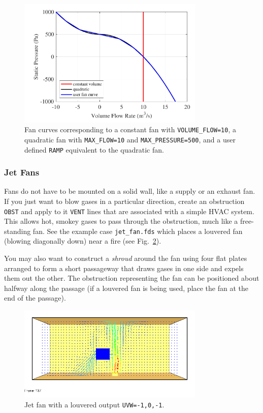 \documentclass[11pt]{book}
\newcommand{\ct}{\tt\small}
\begin{document}
\begin{figure}[ht!]
\begin{center}
\includegraphics[width=3.5in]{SCRIPT_FIGURES/fan_curve}
\caption[Example of fan curves]{Fan curves corresponding to a constant fan with {\ct VOLUME\_FLOW=10}, a quadratic fan with {\ct MAX\_FLOW=10} and {\ct MAX\_PRESSURE=500}, and a user defined {\ct RAMP} equivalent to the quadratic fan.}
\label{fig:Fan_Curve}
\end{center}
\end{figure}

\subsubsection{Jet Fans}

Fans do not have to be mounted on a solid wall, like a supply or an exhaust fan.
If you just want to blow gases in a particular direction, create an
obstruction {\ct OBST} and apply to it {\ct VENT} lines that are
associated with a simple HVAC system.
This allows hot, smokey gases to pass through the
obstruction, much like a free-standing fan.  See the example case {\ct jet\_fan.fds} which places a louvered fan (blowing diagonally down) near a fire (see Fig.~\ref{fig:Jet_Fan}).

You may also want to construct a {\em shroud} around the fan using four flat plates arranged to form
a short passageway that draws gases in one side and expels them out the other. The obstruction representing the fan can be positioned about halfway along the passage (if a louvered fan is being used, place the fan at the end of the passage).

\begin{figure}[ht!]
\begin{center}
\includegraphics[width=3.5in]{SCRIPT_FIGURES/jet_fan}
\caption[Example of a jet fan]{Jet fan with a louvered output {\ct UVW=-1,0,-1}.}
\label{fig:Jet_Fan}
\end{center}
\end{figure}
\end{document}

